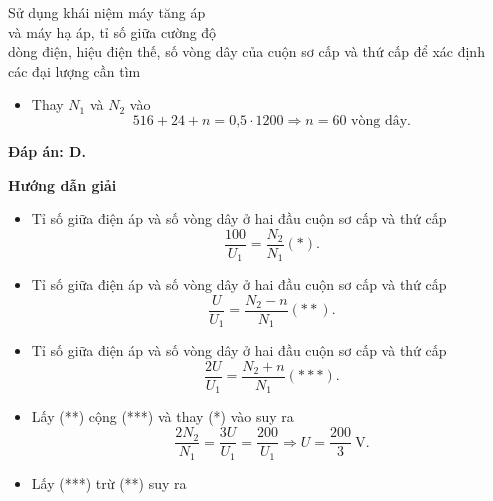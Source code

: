 \begin{dang}{Sử dụng khái niệm máy tăng áp \\ và máy hạ áp, tỉ số giữa cường độ\\ dòng điện, hiệu điện thế, số vòng dây của cuộn sơ cấp và thứ cấp để xác định \\các đại lượng cần tìm}
{\begin{itemize}
\begin{equation*}
			\end{equation*}
			\item Thay $N_1$ và $N_2$ vào 
			\begin{equation*}
				516 + 24 + n = \text{0,5} \cdot 1200 \Rightarrow n = 60 \text{ vòng dây}.
			\end{equation*}	
		\end{itemize}	
		\textbf{Đáp án: D.}
	}
	{	\begin{center}
			\textbf{Hướng dẫn giải}
		\end{center}
		\begin{itemize}
			\item Tỉ số giữa điện áp và số vòng dây ở hai đầu cuộn sơ cấp và thứ cấp
			\begin{equation*}
				\dfrac{100}{U_1}=\dfrac{N_2}{N_1}(*). 
			\end{equation*}
			\item Tỉ số giữa điện áp và số vòng dây ở hai đầu cuộn sơ cấp và thứ cấp
			\begin{equation*}
				\dfrac{U}{U_1}=\dfrac{N_2-n}{N_1}(**). 
			\end{equation*}
			\item Tỉ số giữa điện áp và số vòng dây ở hai đầu cuộn sơ cấp và thứ cấp
			\begin{equation*}
				\dfrac{2U}{U_1}=\dfrac{N_2+n}{N_1}(***). 
			\end{equation*}
			\item Lấy (**) cộng (***) và thay (*) vào suy ra 
			\begin{equation*}
				\dfrac{2N_2}{N_1}=\dfrac{3U}{U_1}=\dfrac{200}{U_1} \Rightarrow U = \dfrac{200}{3}\ \text{V}.
			\end{equation*}
			\item Lấy (***) trừ (**) suy ra 

\end{itemize}}
\end{dang}
